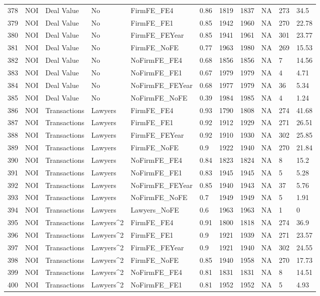 \begin{table}[ht]
\begin{tabular}{rllllllllll}
  378 & NOI & Deal Value & No & FirmFE\_FE4 & 0.86 & 1819 & 1837 & NA & 273 & 34.5 \\ 
  379 & NOI & Deal Value & No & FirmFE\_FE1 & 0.85 & 1942 & 1960 & NA & 270 & 22.78 \\ 
  380 & NOI & Deal Value & No & FirmFE\_FEYear & 0.85 & 1941 & 1961 & NA & 301 & 23.77 \\ 
  381 & NOI & Deal Value & No & FirmFE\_NoFE & 0.77 & 1963 & 1980 & NA & 269 & 15.53 \\ 
  382 & NOI & Deal Value & No & NoFirmFE\_FE4 & 0.68 & 1856 & 1856 & NA & 7 & 14.56 \\ 
  383 & NOI & Deal Value & No & NoFirmFE\_FE1 & 0.67 & 1979 & 1979 & NA & 4 & 4.71 \\ 
  384 & NOI & Deal Value & No & NoFirmFE\_FEYear & 0.68 & 1977 & 1979 & NA & 36 & 5.34 \\ 
  385 & NOI & Deal Value & No & NoFirmFE\_NoFE & 0.39 & 1984 & 1985 & NA & 4 & 1.24 \\ 
  386 & NOI & Transactions & Lawyers & FirmFE\_FE4 & 0.93 & 1790 & 1808 & NA & 274 & 41.68 \\ 
  387 & NOI & Transactions & Lawyers & FirmFE\_FE1 & 0.92 & 1912 & 1929 & NA & 271 & 26.51 \\ 
  388 & NOI & Transactions & Lawyers & FirmFE\_FEYear & 0.92 & 1910 & 1930 & NA & 302 & 25.85 \\ 
  389 & NOI & Transactions & Lawyers & FirmFE\_NoFE & 0.9 & 1922 & 1940 & NA & 270 & 21.84 \\ 
  390 & NOI & Transactions & Lawyers & NoFirmFE\_FE4 & 0.84 & 1823 & 1824 & NA & 8 & 15.2 \\ 
  391 & NOI & Transactions & Lawyers & NoFirmFE\_FE1 & 0.83 & 1945 & 1945 & NA & 5 & 5.28 \\ 
  392 & NOI & Transactions & Lawyers & NoFirmFE\_FEYear & 0.85 & 1940 & 1943 & NA & 37 & 5.76 \\ 
  393 & NOI & Transactions & Lawyers & NoFirmFE\_NoFE & 0.7 & 1949 & 1949 & NA & 5 & 1.91 \\ 
  394 & NOI & Transactions & Lawyers & Lawyers\_NoFE & 0.6 & 1963 & 1963 & NA & 1 & 0 \\ 
  395 & NOI & Transactions & Lawyers^2 & FirmFE\_FE4 & 0.91 & 1800 & 1818 & NA & 274 & 36.9 \\ 
  396 & NOI & Transactions & Lawyers^2 & FirmFE\_FE1 & 0.9 & 1921 & 1939 & NA & 271 & 23.57 \\ 
  397 & NOI & Transactions & Lawyers^2 & FirmFE\_FEYear & 0.9 & 1921 & 1940 & NA & 302 & 24.55 \\ 
  398 & NOI & Transactions & Lawyers^2 & FirmFE\_NoFE & 0.85 & 1940 & 1958 & NA & 270 & 17.73 \\ 
  399 & NOI & Transactions & Lawyers^2 & NoFirmFE\_FE4 & 0.81 & 1831 & 1831 & NA & 8 & 14.51 \\ 
  400 & NOI & Transactions & Lawyers^2 & NoFirmFE\_FE1 & 0.81 & 1952 & 1952 & NA & 5 & 4.93 \\ 
   \hline
\end{tabular}
\end{table}
